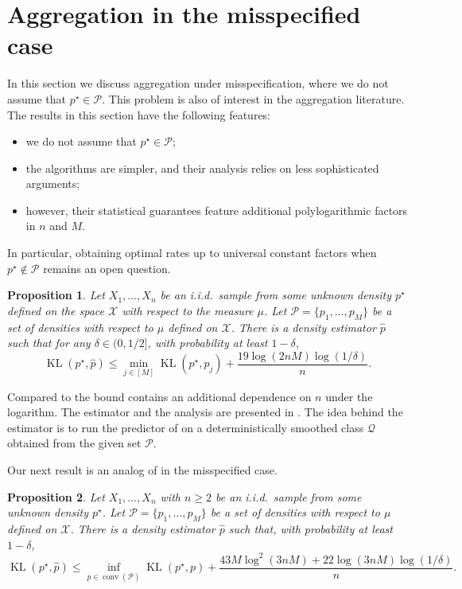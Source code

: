 \documentclass[11pt]{article}
\renewcommand{\le}{\leqslant}
\renewcommand{\ge}{\geqslant}
\newcommand{\M}{M}
\newcommand{\X}{\mathcal{X}}
\newcommand{\Qs}{\mathcal{Q}}
\newcommand{\kl}{\operatorname{KL}}
\newtheorem{proposition}{Proposition}
\theoremstyle{definition}
\theoremstyle{remark}
\begin{document}
\section{Aggregation in the misspecified case}
\label{sec:misspecified}
In this section we discuss aggregation under misspecification, where we do not assume that $p^\star \in \mathcal{P}$. This problem is also of interest in the aggregation literature. The results in this section have the following features:
\begin{itemize}
\item we do not assume that $p^\star \in \mathcal{P}$;
\item the algorithms are simpler, and their analysis relies on less sophisticated arguments;  
\item however, their statistical guarantees feature additional polylogarithmic factors in $n$ and $\M$.
\end{itemize}
In particular,
obtaining optimal rates up to universal constant factors when $p^\star \notin \mathcal{P}$ remains an open question.

\begin{proposition}
\label{prop:misspecmodelaggregation}
Let $X_{1}, \ldots, X_n$ be an i.i.d.\ sample from some unknown density $p^\star$ defined on the space $\X$ with respect to the measure $\mu$. Let $\mathcal{P} = \{p_1, \ldots, p_\M\}$ be a set of densities with respect to $\mu$ defined on $\X$. There is a density estimator $\widehat{p}$ such that for any $\delta \in (0, 1/2]$, with probability at least $1 - \delta$,
\[
\kl\left(p^\star, \widehat{p}\right)
\le \min_{j \in [M]}\kl\left(p^\star, p_j\right)
+ \frac{19\log(2nM)\log(1/\delta)}{n}.
\]
\end{proposition}
Compared to  the bound contains an additional dependence on $n$ under the logarithm. The estimator and the analysis are presented in . The idea behind the estimator is to run the predictor of  on a deterministically smoothed class $\Qs$ obtained from the given set $\mathcal{P}$.

Our next result is an analog of  in the misspecified case.
\begin{proposition}
\label{prop:misspecconvexaggregation}
    Let $X_{1}, \ldots, X_n$ with $n \ge 2$ be an i.i.d.\ sample from some unknown density $p^\star$. Let $\mathcal{P} = \{p_1, \ldots, p_\M\}$ be a set of densities with respect to $\mu$ defined on $\X$. There is a density estimator $\widehat{p}$ such that, with probability at least $1 - \delta$,
    \[
    \kl\left(p^\star, \widehat{p}\right) \le \inf\limits_{p \in \operatorname{conv}(\mathcal{P})}\kl\left(p^\star, p\right) + \frac{43M\log^2(3nM) + 22\log(3nM)\log(1/\delta)}{n}.
    \]
\end{proposition}
\end{document}
